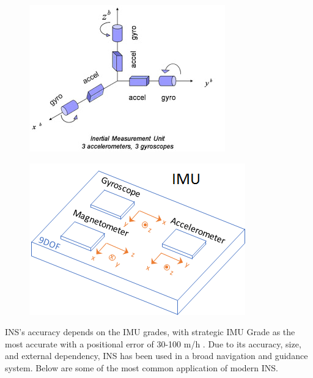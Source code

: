 \begin{figure}[!ht]
\centering
\begin{minipage}{.5\textwidth}
  \centering
  \includegraphics[height=0.7\linewidth]{Figures/imu_6dof.jpg}
  \label{fig:IMU6DOF}
\end{minipage}%
\begin{minipage}{.5\textwidth}
  \centering
  \includegraphics[height=0.7\linewidth]{Figures/imu_diagram.png}
  \label{fig:9DOFIMU}
\end{minipage}
\end{figure}


\noindent INS's accuracy depends on the IMU grades, with strategic IMU Grade as the most accurate with a positional error of 30-100 m/h \cite{El-Sheimy2020InertialTrends}. Due to its accuracy, size, and external dependency, INS has been used in a broad navigation and guidance system. Below are some of the most common application of modern INS.


